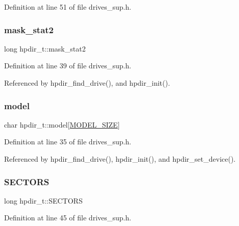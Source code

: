 Definition at line 51 of file drives\+\_\+sup.\+h.

\mbox{\label{structhpdir__t_a788d1032b8ff695092f9e4ff4cf36adf}} 
\subsubsection{\texorpdfstring{mask\+\_\+stat2}{mask\_stat2}}
{\footnotesize\ttfamily long hpdir\+\_\+t\+::mask\+\_\+stat2}



Definition at line 39 of file drives\+\_\+sup.\+h.



Referenced by hpdir\+\_\+find\+\_\+drive(), and hpdir\+\_\+init().

\mbox{\label{structhpdir__t_a3855aafd93d84611573376653f9cd2c0}} 
\subsubsection{\texorpdfstring{model}{model}}
{\footnotesize\ttfamily char hpdir\+\_\+t\+::model\mbox{[}\hyperlink{drives__sup_8h_a3f11d81c1e6d925611a9bdd5115064a0}{M\+O\+D\+E\+L\+\_\+\+S\+I\+ZE}\mbox{]}}



Definition at line 35 of file drives\+\_\+sup.\+h.



Referenced by hpdir\+\_\+find\+\_\+drive(), hpdir\+\_\+init(), and hpdir\+\_\+set\+\_\+device().

\mbox{\label{structhpdir__t_a6ee950a83086b3872cfd8fab8d809bf2}} 
\subsubsection{\texorpdfstring{S\+E\+C\+T\+O\+RS}{SECTORS}}
{\footnotesize\ttfamily long hpdir\+\_\+t\+::\+S\+E\+C\+T\+O\+RS}



Definition at line 45 of file drives\+\_\+sup.\+h.




